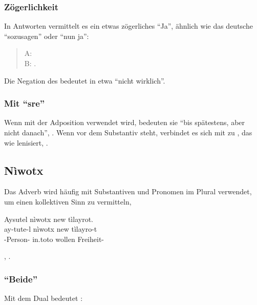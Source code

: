 \subsubsection{Zögerlichkeit} In Antworten vermittelt es ein etwas zögerliches ``Ja'', ähnlich wie das deutsche ``sozusagen'' oder ``nun ja'':

\begin{quotation}
	\noindent A:  \\
	\noindent B:  .
\end{quotation}

\noindent Die Negation des  bedeutet in etwa ``nicht wirklich''. 

\subsubsection{Mit ``sre''} Wenn  mit der Adposition  verwendet wird, bedeuten sie ``bis spätestens, aber nicht danach'',  . \label{syn:li:sre} Wenn  vor dem Substantiv steht, verbindet es sich mit  zu , das wie  lenisiert,  .


\subsection{Nìwotx} Das Adverb   wird häufig mit Substantiven und Pronomen im Plural verwendet, um einen kollektiven Sinn zu vermitteln,

\begin{interlin}
	\glll Aysutel nìwotx new tìlayrot. \\
	ay-tute-l nìwotx new tìlayro-t \\
	-Person- in.toto wollen Freiheit- \\
	 \Ipawl{}
\end{interlin}

\noindent{} ,  .

\subsubsection{``Beide''} Mit dem Dual bedeutet  :

